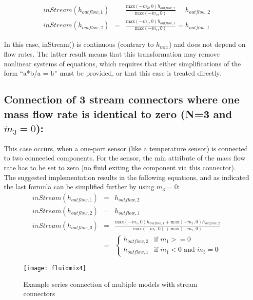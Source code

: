 \begin{eqnarray*}
inStream(h_{outflow,1})&=&\frac{\text{max}(-\dot{m}_2,0)h_{outflow,2}}{\text{max}(-\dot{m}_2,0)}=h_{outflow,2}\\
inStream(h_{outflow,2})&=&\frac{\text{max}(-\dot{m}_1,0)h_{outflow,1}}{\text{max}(-\dot{m}_1,0)}=h_{outflow,1}
\end{eqnarray*}

In this case, inStream() is continuous (contrary to $h_{mix}$) and does not
depend on flow rates. The latter result means that this transformation
may remove nonlinear systems of equations, which requires that either
simplifications of the form ``a*b/a = b'' must be provided, or that this
case is treated directly.

\subsection{Connection of 3 stream connectors where one mass flow rate is identical to zero (N=3 and $\dot{m}_3=0$):}
This case occurs, when a one-port sensor (like a temperature sensor) is
connected to two connected components. For the sensor, the min attribute
of the mass flow rate has to be set to zero (no fluid exiting the
component via this connector). The suggested implementation results in
the following equations, and as indicated the last formula can be
simplified further by using $\dot{m}_3=0$:
\begin{eqnarray*}
inStream(h_{outflow,1})&=&h_{outflow,2}\\
inStream(h_{outflow,2})&=&h_{outflow,1}\\
inStream(h_{outflow,3})&=&\frac{\text{max}(-\dot{m}_1,0)h_{outflow,1}+\text{max}(-\dot{m}_2,0)h_{outflow,2}}{\text{max}(-\dot{m}_1,0)+\text{max}(-\dot{m}_2,0)}\\
&=&\begin{cases}
h_{outflow,2}&\text{if $\dot{m}_1>=0$}\\
h_{outflow,1}&\text{if $\dot{m}_1<0$ and $\dot{m}_3=0$}
\end{cases}
\end{eqnarray*}
\begin{figure}[H]
\caption{Example series connection of multiple models with stream connectors }
\begin{center}
\texttt{[image: fluidmix4]}
\end{center}
\end{figure}

